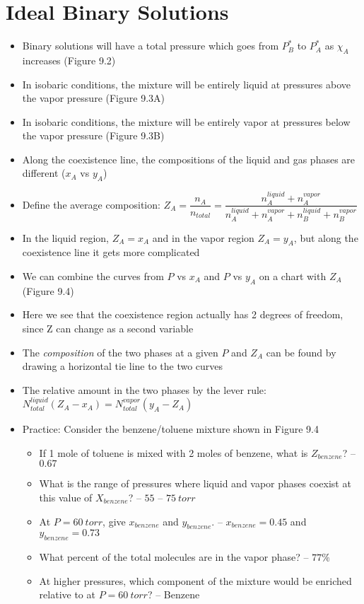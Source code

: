 \documentclass[12pt, openany, letterpaper]{memoir}
\begin{document}
\section*{Ideal Binary Solutions}
\begin{itemize}
	\item Binary solutions will have a total pressure which goes from $P_B^*$ to $P_A^*$ as $\chi_A$ increases (Figure 9.2)
	\item In isobaric conditions, the mixture will be entirely liquid at pressures above the vapor pressure (Figure 9.3A)
	\item In isobaric conditions, the mixture will be entirely vapor at pressures below the vapor pressure (Figure 9.3B)
	\item Along the coexistence line, the compositions of the liquid and gas phases are different ($x_A$ vs $y_A$)
	\item Define the average composition: $Z_A = \dfrac{n_A}{n_{total}} = \dfrac{n_A^{liquid}+n_A^{vapor}}{n_A^{liquid}+n_A^{vapor}+n_B^{liquid}+n_B^{vapor}}$
	\item In the liquid region, $Z_A = x_A$ and in the vapor region $Z_A = y_A$, but along the coexistence line it gets more complicated
	\item We can combine the curves from $P$ vs $x_A$ and $P$ vs $y_A$ on a chart with $Z_A$ (Figure 9.4)
	\item Here we see that the coexistence region actually has 2 degrees of freedom, since Z can change as a second variable
	\item The \emph{composition} of the two phases at a given $P$ and $Z_A$ can be found by drawing a horizontal tie line to the two curves
	\item The relative amount in the two phases by the lever rule: $N_{total}^{liquid}\left(Z_A-x_A\right) = N_{total}^{vapor}\left(y_A-Z_A\right)$
	\item Practice: Consider the benzene/toluene mixture shown in Figure 9.4
	\begin{itemize}
		\item If 1 mole of toluene is mixed with 2 moles of benzene, what is $Z_{benzene}$? -- $0.67$
		\item What is the range of pressures where liquid and vapor phases coexist at this value of $X_{benzene}$? -- $55$ -- $75~torr$
		\item At $P=60~torr$, give $x_{benzene}$ and $y_{benzene}$. -- $x_{benzene} = 0.45$ and $y_{benzene} = 0.73$
		\item What percent of the total molecules are in the vapor phase? -- $77\%$
		\item At higher pressures, which component of the mixture would be enriched relative to at $P=60~torr$? -- Benzene
	\end{itemize}
\end{itemize}
\end{document}
